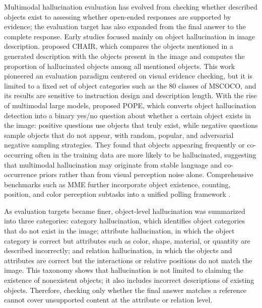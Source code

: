 Multimodal hallucination evaluation has evolved from checking whether described objects exist to assessing whether open-ended responses are supported by evidence; the evaluation target has also expanded from the final answer to the complete response. Early studies focused mainly on object hallucination in image description. \citet{rohrbach2018object} proposed CHAIR, which compares the objects mentioned in a generated description with the objects present in the image and computes the proportion of hallucinated objects among all mentioned objects. This work pioneered an evaluation paradigm centered on visual evidence checking, but it is limited to a fixed set of object categories such as the 80 classes of MSCOCO, and its results are sensitive to instruction design and description length. With the rise of multimodal large models, \citet{li2023evaluating} proposed POPE, which converts object hallucination detection into a binary yes/no question about whether a certain object exists in the image: positive questions use objects that truly exist, while negative questions sample objects that do not appear, with random, popular, and adversarial negative sampling strategies. They found that objects appearing frequently or co-occurring often in the training data are more likely to be hallucinated, suggesting that multimodal hallucination may originate from stable language and co-occurrence priors rather than from visual perception noise alone. Comprehensive benchmarks such as MME further incorporate object existence, counting, position, and color perception subtasks into a unified polling framework \citep{fu2023mme}.

As evaluation targets became finer, object-level hallucination was summarized into three categories: category hallucination, which identifies object categories that do not exist in the image; attribute hallucination, in which the object category is correct but attributes such as color, shape, material, or quantity are described incorrectly; and relation hallucination, in which the objects and attributes are correct but the interactions or relative positions do not match the image. This taxonomy shows that hallucination is not limited to claiming the existence of nonexistent objects; it also includes incorrect descriptions of existing objects. Therefore, checking only whether the final answer matches a reference cannot cover unsupported content at the attribute or relation level.

